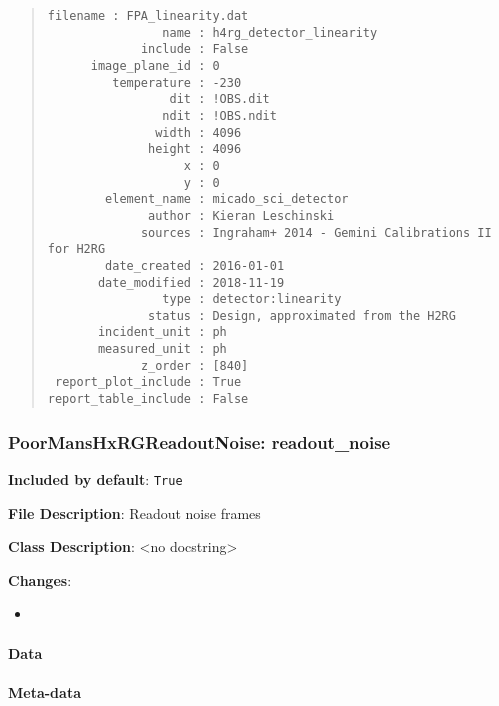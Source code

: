 \begin{quote}
\begin{alltt}
\begin{lstlisting}[frame=single]
            filename : FPA_linearity.dat
                name : h4rg_detector_linearity
             include : False
      image_plane_id : 0
         temperature : -230
                 dit : !OBS.dit
                ndit : !OBS.ndit
               width : 4096
              height : 4096
                   x : 0
                   y : 0
        element_name : micado_sci_detector
              author : Kieran Leschinski
             sources : Ingraham+ 2014 - Gemini Calibrations II for H2RG
        date_created : 2016-01-01
       date_modified : 2018-11-19
                type : detector:linearity
              status : Design, approximated from the H2RG
       incident_unit : ph
       measured_unit : ph
             z_order : [840]
 report_plot_include : True
report_table_include : False
\end{lstlisting}
\end{alltt}
\end{quote}


\subsubsection{PoorMansHxRGReadoutNoise: \textquotedbl{}readout\_noise\textquotedbl{}%
  \label{poormanshxrgreadoutnoise-readout-noise}%
}

\textbf{Included by default}: \texttt{True}

\textbf{File Description}: Readout noise frames

\textbf{Class Description}: <no docstring>

\textbf{Changes}:

\begin{itemize}
\item \end{itemize}


\paragraph{Data%
  \label{id11}%
}


\paragraph{Meta-data%
  \label{id12}%
}

